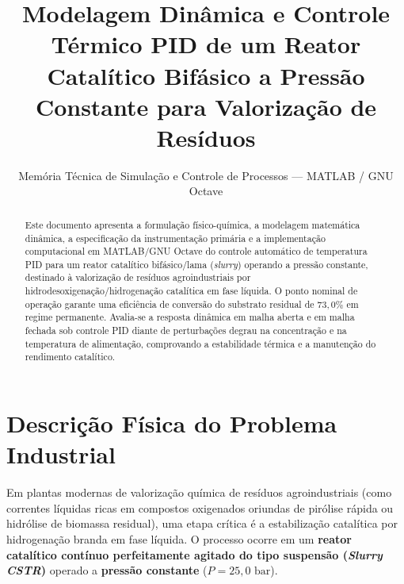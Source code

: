 \documentclass[11pt, a4paper]{article}
\title{\textbf{\color{navy}Modelagem Dinâmica e Controle Térmico PID de um Reator Catalítico Bifásico a Pressão Constante para Valorização de Resíduos}}
\author{Memória Técnica de Simulação e Controle de Processos --- MATLAB / GNU Octave}
\date{}
\begin{document}
\maketitle

\begin{abstract}
\noindent Este documento apresenta a formulação físico-química, a modelagem matemática dinâmica, a especificação da instrumentação primária e a implementação computacional em MATLAB/GNU Octave do controle automático de temperatura PID para um reator catalítico bifásico/lama (\textit{slurry}) operando a pressão constante, destinado à valorização de resíduos agroindustriais por hidrodesoxigenação/hidrogenação catalítica em fase líquida. O ponto nominal de operação garante uma eficiência de conversão do substrato residual de $73{,}0\%$ em regime permanente. Avalia-se a resposta dinâmica em malha aberta e em malha fechada sob controle PID diante de perturbações degrau na concentração e na temperatura de alimentação, comprovando a estabilidade térmica e a manutenção do rendimento catalítico.
\end{abstract}

\section{Descrição Física do Problema Industrial}

Em plantas modernas de valorização química de resíduos agroindustriais (como correntes líquidas ricas em compostos oxigenados oriundas de pirólise rápida ou hidrólise de biomassa residual), uma etapa crítica é a estabilização catalítica por hidrogenação branda em fase líquida. O processo ocorre em um \textbf{reator catalítico contínuo perfeitamente agitado do tipo suspensão (\textit{Slurry CSTR})} operado a \textbf{pressão constante} ($P = 25{,}0\text{ bar}$).
\end{document}
